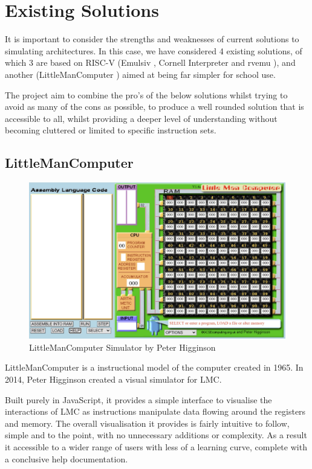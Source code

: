 \section{Existing Solutions}

It is important to consider the strengths and weaknesses of current solutions to simulating architectures. In this case, we have considered 4 existing solutions, of which 3 are based on RISC-V (Emulsiv \cite{savaton_2023_eseotechemulsiv}, Cornell Interpreter \cite{cornelluniversity_riscv} and rvemu \cite{doi_2021_d0iasmrvemu}), and another (LittleManComputer \cite{higginson_2014_little}) aimed at being far simpler for school use.

The project aim to combine the pro's of the below solutions whilst trying to avoid as many of the cons as possible, to produce a well rounded solution that is accessible to all, whilst providing a deeper level of understanding without becoming cluttered or limited to specific instruction sets.

\subsection{LittleManComputer}\label{sec:lmc}
\begin{figure}[H]
    \centering
    \includegraphics[width=0.75\linewidth]{dissertation/DATA/LMC.jpg}
    \caption{LittleManComputer Simulator by Peter Higginson}
    \label{fig:lmc}
\end{figure}
LittleManComputer \cite{higginson_2014_little} is a instructional model of the computer created in 1965. In 2014, Peter Higginson created a visual simulator \cite{higginson_2014_little} for LMC.

Built purely in JavaScript, it provides a simple interface to visualise the interactions of LMC as instructions manipulate data flowing around the registers and memory. The overall visualisation it provides is fairly intuitive to follow, simple and to the point, with no unnecessary additions or complexity. As a result it accessible to a wider range of users with less of a learning curve, complete with a conclusive help documentation.

